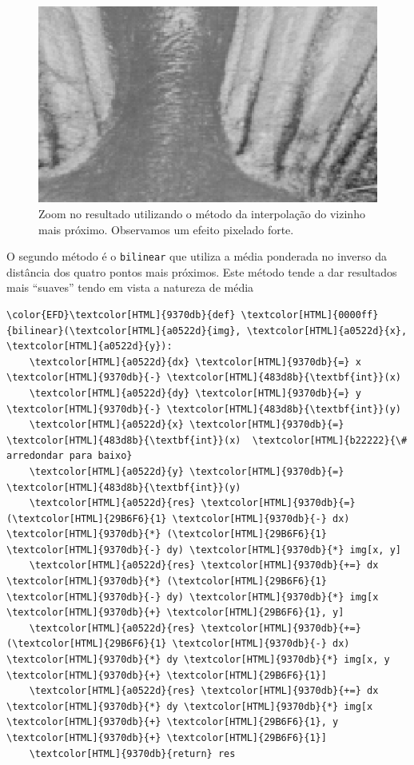 \documentclass[11pt]{article}
\begin{document}
\begin{figure}[htbp]
\centering
\includegraphics[width=.9\linewidth]{./out/proximo.png}
\caption{Zoom no resultado utilizando o método da interpolação do vizinho mais próximo. Observamos um efeito pixelado forte.}
\end{figure}

O segundo método é o \texttt{bilinear} que utiliza a média ponderada no inverso da distância dos quatro pontos mais próximos.
Este método tende a dar resultados mais ``suaves'' tendo em vista a natureza de média
\begin{Code}
\begin{Verbatim}
\color{EFD}\textcolor[HTML]{9370db}{def} \textcolor[HTML]{0000ff}{bilinear}(\textcolor[HTML]{a0522d}{img}, \textcolor[HTML]{a0522d}{x}, \textcolor[HTML]{a0522d}{y}):
    \textcolor[HTML]{a0522d}{dx} \textcolor[HTML]{9370db}{=} x \textcolor[HTML]{9370db}{-} \textcolor[HTML]{483d8b}{\textbf{int}}(x)
    \textcolor[HTML]{a0522d}{dy} \textcolor[HTML]{9370db}{=} y \textcolor[HTML]{9370db}{-} \textcolor[HTML]{483d8b}{\textbf{int}}(y)
    \textcolor[HTML]{a0522d}{x} \textcolor[HTML]{9370db}{=} \textcolor[HTML]{483d8b}{\textbf{int}}(x)  \textcolor[HTML]{b22222}{\# arredondar para baixo}
    \textcolor[HTML]{a0522d}{y} \textcolor[HTML]{9370db}{=} \textcolor[HTML]{483d8b}{\textbf{int}}(y)
    \textcolor[HTML]{a0522d}{res} \textcolor[HTML]{9370db}{=} (\textcolor[HTML]{29B6F6}{1} \textcolor[HTML]{9370db}{-} dx) \textcolor[HTML]{9370db}{*} (\textcolor[HTML]{29B6F6}{1} \textcolor[HTML]{9370db}{-} dy) \textcolor[HTML]{9370db}{*} img[x, y]
    \textcolor[HTML]{a0522d}{res} \textcolor[HTML]{9370db}{+=} dx \textcolor[HTML]{9370db}{*} (\textcolor[HTML]{29B6F6}{1} \textcolor[HTML]{9370db}{-} dy) \textcolor[HTML]{9370db}{*} img[x \textcolor[HTML]{9370db}{+} \textcolor[HTML]{29B6F6}{1}, y]
    \textcolor[HTML]{a0522d}{res} \textcolor[HTML]{9370db}{+=} (\textcolor[HTML]{29B6F6}{1} \textcolor[HTML]{9370db}{-} dx) \textcolor[HTML]{9370db}{*} dy \textcolor[HTML]{9370db}{*} img[x, y \textcolor[HTML]{9370db}{+} \textcolor[HTML]{29B6F6}{1}]
    \textcolor[HTML]{a0522d}{res} \textcolor[HTML]{9370db}{+=} dx \textcolor[HTML]{9370db}{*} dy \textcolor[HTML]{9370db}{*} img[x \textcolor[HTML]{9370db}{+} \textcolor[HTML]{29B6F6}{1}, y \textcolor[HTML]{9370db}{+} \textcolor[HTML]{29B6F6}{1}]
    \textcolor[HTML]{9370db}{return} res
\end{Verbatim}
\end{Code}
\end{document}

